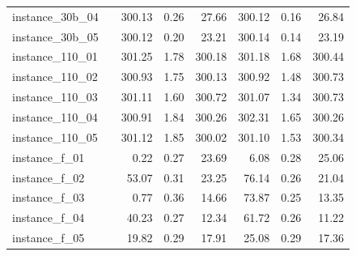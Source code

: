 \documentclass[12pt,a4paper,openright,twoside]{book}
\begin{document}
\begin{table}[H]
{\begin{tabular}{|ll|rrr|rrr|}
instance\_30b\_04              &     &    300.13 &   0.26 &     27.66 &    300.12 &     0.16 &     26.84 \\ 
instance\_30b\_05              &     &    300.12 &   0.20 &     23.21 &    300.14 &     0.14 &     23.19 \\ 
instance\_110\_01             &     &    301.25 &   1.78 &    300.18 &    301.18 &     1.68 &    300.44 \\ 
instance\_110\_02             &     &    300.93 &   1.75 &    300.13 &    300.92 &     1.48 &    300.73 \\ 
instance\_110\_03             &     &    301.11 &   1.60 &    300.72 &    301.07 &     1.34 &    300.73 \\ 
instance\_110\_04             &     &    300.91 &   1.84 &    300.26 &    302.31 &     1.65 &    300.26 \\ 
instance\_110\_05             &     &    301.12 &   1.85 &    300.02 &    301.10 &     1.53 &    300.34 \\ 
instance\_f\_01                &     &    0.22 &     0.27 &    23.69  &      6.08 &     0.28 &    25.06  \\  
instance\_f\_02                &     &   53.07 &     0.31 &    23.25   &     76.14 &     0.26 &    21.04  \\  
instance\_f\_03                &     &    0.77 &     0.36 &    14.66   &     73.87 &     0.25 &    13.35  \\  
instance\_f\_04                &     &   40.23 &     0.27 &    12.34   &     61.72 &     0.26 &    11.22  \\  
instance\_f\_05                &     &   19.82 &     0.29 &    17.91   &     25.08 &     0.29 &    17.36  \\  
\hline
\end{tabular}
}
\end{table}
\end{document}
